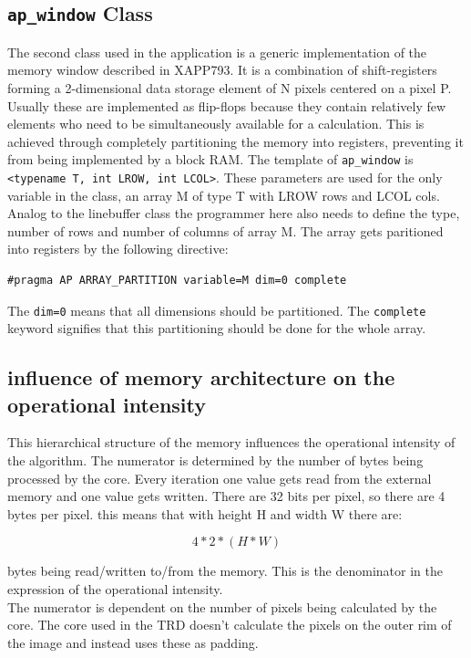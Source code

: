 \documentclass[a4paper]{report}
\begin{document}
\subsection{\texttt{ap\_window} Class}

The second class used in the application is a generic implementation of the memory window described in XAPP793. It is a combination of shift-registers forming a 2-dimensional data storage element of N pixels centered on a pixel P. Usually these are implemented as flip-flops because they contain relatively few elements who need to be simultaneously available for a calculation. This is achieved through completely partitioning the memory into registers, preventing it from being implemented by a block RAM.
The template of \texttt{ap\_window} is \texttt{<typename T, int LROW, int LCOL>}. These parameters are used for the only variable in the class, an array M of type T with LROW rows and LCOL cols. Analog to the linebuffer class the programmer here also needs to define the type, number of rows and number of columns of array M. The array gets paritioned into registers by the following directive:

\begin{verbatim}
#pragma AP ARRAY_PARTITION variable=M dim=0 complete
\end{verbatim}

The \texttt{dim=0} means that all dimensions should be partitioned. The \texttt{complete} keyword signifies that this partitioning should be done for the whole array.


\subsection{influence of memory architecture on the operational intensity}

This hierarchical structure of the memory influences the operational intensity of the algorithm. The numerator is determined by the number of bytes being processed by the core. Every iteration one value gets read from the external memory and one value gets written.  There are 32 bits per pixel, so there are 4 bytes per pixel. this means that with height H and width W there are:

\[
4 * 2 * ( H * W )
\]

bytes being read/written to/from the memory. This is the denominator in the expression of the operational intensity.\\
The numerator is dependent on the number of pixels being calculated by the core. The core used in the TRD doesn't calculate the pixels on the outer rim of the image and instead uses these as padding. 
\end{document}
